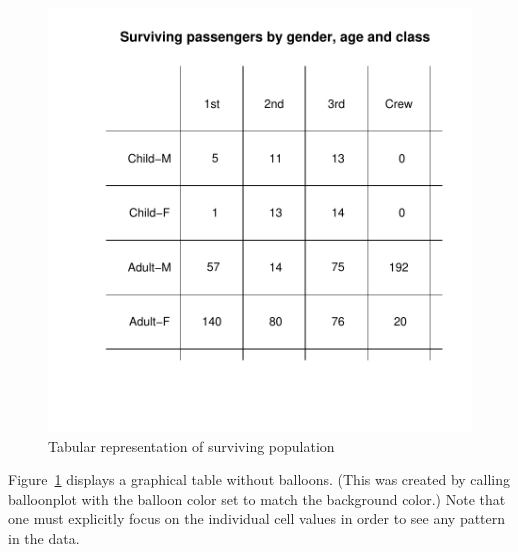 \documentclass[a4paper]{report}
\begin{document}
\begin{article}
\begin{figure}[h]
\includegraphics[width=\textwidth]{SurvivedPopWhite.pdf}
\vspace{-0.65in}
\caption{\label{figure:Surv.Pop.White}
Tabular representation of surviving population}
\end{figure}

Figure~\ref{figure:Surv.Pop.White} displays a graphical table
without balloons.  (This was created by calling balloonplot with the
balloon color set to match the background color.)  Note that one
must explicitly focus on the individual cell values in order to see
any pattern in the data.


\end{article}
\end{document}
